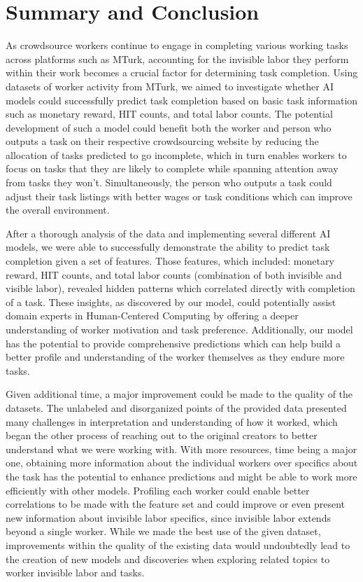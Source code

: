 \documentclass[11pt]{article}
\begin{document}
\pagebreak

\section{Summary and Conclusion}
As crowdsource workers continue to engage in completing various working tasks across platforms such as MTurk, accounting for the invisible labor they perform within their work becomes a crucial factor for determining task completion. Using datasets of worker activity from MTurk, we aimed to investigate whether AI models could successfully predict task completion based on basic task information such as monetary reward, HIT counts, and total labor counts. The potential development of such a model could benefit both the worker and person who outputs a task on their respective crowdsourcing website by reducing the allocation of tasks predicted to go incomplete, which in turn enables workers to focus on tasks that they are likely to complete while spanning attention away from tasks they won't. Simultaneously, the person who outputs a task could adjust their task listings with better wages or task conditions which can improve the overall environment.

After a thorough analysis of the data and implementing several different AI models, we were able to successfully demonstrate the ability to predict task completion given a set of features. Those features, which included: monetary reward, HIT counts, and total labor counts (combination of both invisible and visible labor), revealed hidden patterns which correlated directly with completion of a task. These insights, as discovered by our model, could potentially assist domain experts in Human-Centered Computing by offering a deeper understanding of worker motivation and task preference. Additionally, our model has the potential to provide comprehensive predictions which can help build a better profile and understanding of the worker themselves as they endure more tasks.

Given additional time, a major improvement could be made to the quality of the datasets. The unlabeled and disorganized points of the provided data presented many challenges in interpretation and understanding of how it worked, which began the other process of reaching out to the original creators to better understand what we were working with. With more resources, time being a major one, obtaining more information about the individual workers over specifics about the task has the potential to enhance predictions and might be able to work more efficiently with other models. Profiling each worker could enable better correlations to be made with the feature set and could improve or even present new information about invisible labor specifics, since invisible labor extends beyond a single worker. While we made the best use of the given dataset, improvements within the quality of the existing data would undoubtedly lead to the creation of new models and discoveries when exploring related topics to worker invisible labor and tasks.




\end{document}
